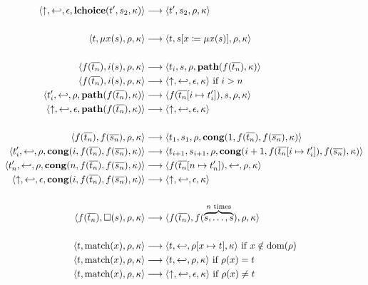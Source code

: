 \documentclass{article}
\begin{document}
{\begin{align*}
  \transition{\fail,\return,\epsilon,\cont{lchoice}{t',s_2,\kappa}}{t',s_2,\rho,\kappa} \\
  \notag \\
  \transition{t,\fix{x}{s},\rho,\kappa}{t,s[x \coloneqq \fix{x}{s}],\rho,\kappa} \\
  \notag \\
  \transition{f(\overline{t_n}),\path{i}{s},\rho,\kappa}
             {t_i,s,\rho,\cont{path}{f(\overline{t_n}),\kappa}} \\
  \transition{f(\overline{t_n}),\path{i}{s},\rho,\kappa}
             {\fail,\return,\epsilon,\kappa}\ \text{if}\ i > n \\
  \transition{t_i',\return,\rho,\cont{path}{f(\overline{t_n}),\kappa}}
             {f(\overline{t_n}[i \mapsto t_i']),s,\rho,\kappa} \\
  \transition{\fail,\return,\epsilon,\cont{path}{f(\overline{t_n}),\kappa}}
             {\fail,\return,\epsilon,\kappa} \\
  \notag \\
  \transition{f(\overline{t_n}),f(\overline{s_n}),\rho,\kappa}
             {t_1,s_1,\rho,\cont{cong}{1,f(\overline{t_n}),f(\overline{s_n}),\kappa}} \\
  \transition{t_i',\return,\rho,\cont{cong}{i,f(\overline{t_n}),f(\overline{s_n}),\kappa}}
             {t_{i+1},s_{i+1},\rho,\cont{cong}{i+1,f(\overline{t_n}[i \mapsto t_i']),f(\overline{s_n}),\kappa}} \\
  \transition{t_n',\return,\rho,\cont{cong}{n,f(\overline{t_n}),f(\overline{s_n}),\kappa}}
             {f(\overline{t_n}[n \mapsto t_n']),\return,\rho,\kappa} \\
  \transition{\fail,\return,\epsilon,\cont{cong}{i,f(\overline{t_n}),f(\overline{s_n}),\kappa}}
             {\fail,\return,\epsilon,\kappa} \\
  \notag \\
  \transition{f(\overline{t_n}),\all{s},\rho,\kappa}
             {f(\overline{t_n}),f(\overbrace{s,\ldots,s}^{n \text{ times}}),\rho,\kappa} \\
  \notag \\
  \transition{t,\match{x},\rho,\kappa}
             {t,\return,\rho[x \mapsto t],\kappa} \text{ if } x \notin \text{dom}(\rho) \\
  \transition{t,\match{x},\rho,\kappa}
             {t,\return,\rho,\kappa} \text{ if } \rho(x) = t \\
  \transition{t,\match{x},\rho,\kappa}
             {\fail,\return,\epsilon,\kappa} \text{ if } \rho(x) \neq t \\

\end{align*}}
\end{document}
